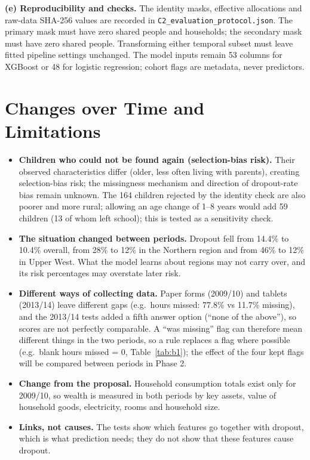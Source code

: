 \documentclass[conference,a4paper]{IEEEtran}
\newcommand{\var}[1]{\texttt{#1}}
\begin{document}
\textbf{(e) Reproducibility and checks.} The identity masks, effective allocations and raw-data SHA-256 values are recorded in \var{C2\_evaluation\_protocol.json}. The primary mask must have zero shared people and households; the secondary mask must have zero shared people. Transforming either temporal subset must leave fitted pipeline settings unchanged. The model inputs remain 53 columns for XGBoost or 48 for logistic regression; cohort flags are metadata, never predictors.

\section{Changes over Time and Limitations}
\label{sec:limits}
\begin{itemize}
\item \textbf{Children who could not be found again (selection-bias risk).} Their observed characteristics differ (older, less often living with parents), creating selection-bias risk; the missingness mechanism and direction of dropout-rate bias remain unknown. The 164 children rejected by the identity check are also poorer and more rural; allowing an age change of 1--8 years would add 59 children (13 of whom left school); this is tested as a sensitivity check.
\item \textbf{The situation changed between periods.} Dropout fell from 14.4\% to 10.4\% overall, from 28\% to 12\% in the Northern region and from 46\% to 12\% in Upper West. What the model learns about regions may not carry over, and its risk percentages may overstate later risk.
\item \textbf{Different ways of collecting data.} Paper forms (2009/10) and tablets (2013/14) leave different gaps (e.g.\ hours missed: 77.8\% vs 11.7\% missing), and the 2013/14 tests added a fifth answer option (``none of the above''), so scores are not perfectly comparable. A ``was missing'' flag can therefore mean different things in the two periods, so a rule replaces a flag where possible (e.g.\ blank hours missed = 0, Table~\ref{tab:b1}); the effect of the four kept flags will be compared between periods in Phase 2.
\item \textbf{Change from the proposal.} Household consumption totals exist only for 2009/10, so wealth is measured in both periods by key assets, value of household goods, electricity, rooms and household size.
\item \textbf{Links, not causes.} The tests show which features go together with dropout, which is what prediction needs; they do not show that these features cause dropout.
\end{itemize}
\end{document}
